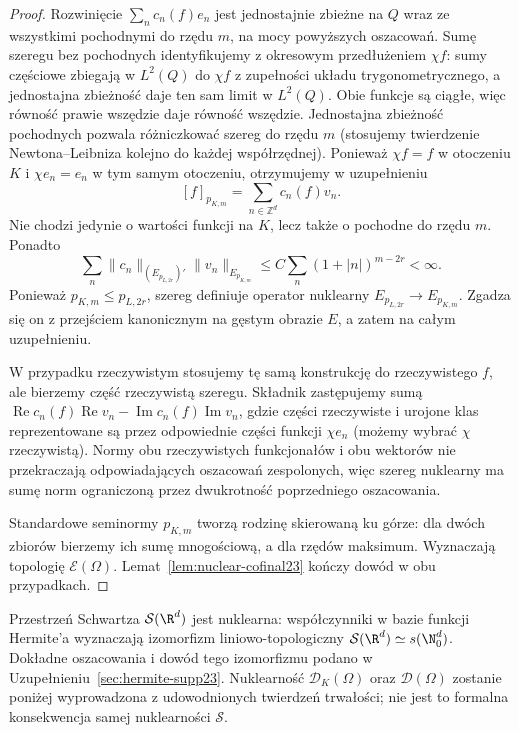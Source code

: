 \begin{proof}
Rozwinięcie $\sum_n c_n(f)e_n$ jest jednostajnie
zbieżne na $Q$ wraz ze wszystkimi pochodnymi do rzędu
$m$, na mocy powyższych oszacowań.
Sumę szeregu bez pochodnych identyfikujemy z okresowym
przedłużeniem $\chi f$: sumy częściowe zbiegają
w $L^2(Q)$ do $\chi f$ z zupełności układu
trygonometrycznego, a jednostajna zbieżność daje
ten sam limit w $L^2(Q)$. Obie funkcje są ciągłe,
więc równość prawie wszędzie daje równość wszędzie.
Jednostajna zbieżność pochodnych pozwala różniczkować
szereg do rzędu $m$ (stosujemy twierdzenie
Newtona--Leibniza kolejno do każdej współrzędnej).
Ponieważ $\chi f=f$ w otoczeniu $K$ i $\chi e_n=e_n$
w tym samym otoczeniu, otrzymujemy w uzupełnieniu
\[
 [f]_{p_{K,m}}=\sum_{n\in\mathbb Z^d}c_n(f)v_n.
\]
Nie chodzi jedynie o wartości funkcji na $K$,
lecz także o pochodne do rzędu $m$.
Ponadto
\[
 \sum_n\|c_n\|_{(E_{p_{L,2r}})'}\|v_n\|_{E_{p_{K,m}}}
 \le C\sum_n(1+|n|)^{m-2r}<\infty.
\]
Ponieważ $p_{K,m}\le p_{L,2r}$, szereg definiuje
operator nuklearny $E_{p_{L,2r}}\to E_{p_{K,m}}$.
Zgadza się on z przejściem kanonicznym na gęstym
obrazie $E$, a zatem na całym uzupełnieniu.

W przypadku rzeczywistym stosujemy tę samą konstrukcję
do rzeczywistego $f$, ale bierzemy część rzeczywistą
szeregu. Składnik zastępujemy sumą
$\operatorname{Re}c_n(f)\operatorname{Re}v_n-
\operatorname{Im}c_n(f)\operatorname{Im}v_n$,
gdzie części rzeczywiste i urojone klas reprezentowane
są przez odpowiednie części funkcji $\chi e_n$
(możemy wybrać $\chi$ rzeczywistą).
Normy obu rzeczywistych funkcjonałów i obu wektorów
nie przekraczają odpowiadających oszacowań zespolonych,
więc szereg nuklearny ma sumę norm ograniczoną przez
dwukrotność poprzedniego oszacowania.

Standardowe seminormy $p_{K,m}$ tworzą rodzinę
skierowaną ku górze: dla dwóch zbiorów bierzemy
ich sumę mnogościową, a dla rzędów maksimum.
Wyznaczają topologię $\mathcal E(\Omega)$.
Lemat~\ref{lem:nuclear-cofinal23} kończy dowód
w obu przypadkach.
\end{proof}

\begin{uwaga}
\label{rem:hermite-nuclear23}
Przestrzeń Schwartza $\mathcal S(\R^d)$ jest nuklearna:
współczynniki w bazie funkcji Hermite'a wyznaczają
izomorfizm liniowo-topologiczny
$\mathcal S(\R^d)\simeq s(\N_0^d)$.
Dokładne oszacowania i dowód tego izomorfizmu podano
w Uzupełnieniu~\ref{sec:hermite-supp23}.
Nuklearność $\mathcal D_K(\Omega)$ oraz
$\mathcal D(\Omega)$ zostanie poniżej wyprowadzona
z udowodnionych twierdzeń trwałości; nie jest to
formalna konsekwencja samej nuklearności $\mathcal S$.
\end{uwaga}

